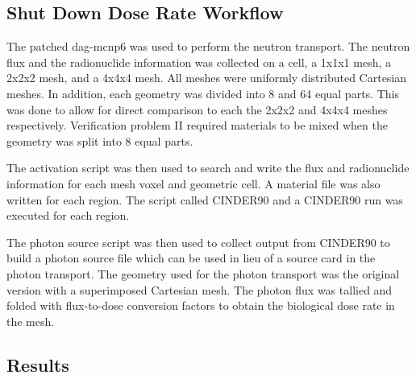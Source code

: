 %
\subsection{Shut Down Dose Rate Workflow}
The patched \gls{dag}-\gls{mcnp}6 was used to
perform the neutron transport. The neutron flux and the radionuclide information
was collected on a cell, a 1x1x1 mesh, a 2x2x2 mesh, and a 4x4x4 mesh. All
meshes were uniformly distributed Cartesian meshes. In addition, each geometry
was divided into 8 and 64 equal parts. This was done to allow for direct
comparison to each the 2x2x2 and 4x4x4 meshes respectively.
Verification problem II required materials to be mixed when the geometry was
split into 8 equal parts.

The activation script was then used to search  and write the flux and radionuclide
information for each mesh voxel and geometric cell. A material file was also
written for each region. The script called CINDER90 and a CINDER90 run was
executed for each region.

The photon source script was then used to collect output from CINDER90 to
build a photon source file which can be used in lieu of a source card in the
photon transport. The geometry used for the photon transport was the original
version with a superimposed Cartesian mesh. The photon flux was tallied and
folded with flux-to-dose conversion factors to obtain the biological dose rate
in the mesh.
%
\subsection{Results}
